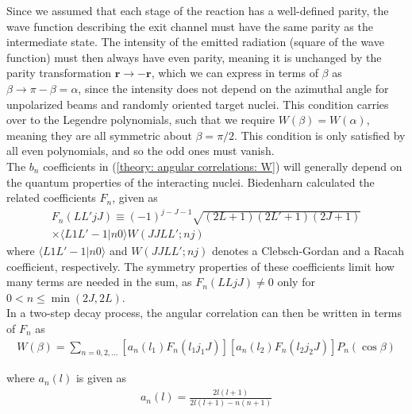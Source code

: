 Since we assumed that each stage of the reaction has a well-defined parity, the wave function describing the exit channel must have the same parity as the intermediate state. The intensity of the emitted radiation (square of the wave function) must then always have even parity, meaning it is unchanged by the parity transformation $\textbf{r} \rightarrow -\textbf{r}$, which we can express in terms of $\beta$ as $\beta \rightarrow \pi - \beta = \alpha$, since the intensity does not depend on the azimuthal angle for unpolarized beams and randomly oriented target nuclei. This condition carries over to the Legendre polynomials, such that we require $W(\beta) = W(\alpha)$, meaning they are all symmetric about $\beta = \pi/2$. This condition is only satisfied by all even polynomials, and so the odd ones must vanish. \\

The $b_n$ coefficients in (\ref{theory: angular correlations: W}) will generally depend on the quantum properties of the interacting nuclei. Biedenharn \cite{Biedenharn} calculated the related coefficients $F_n$, given as
\begin{align*}
	F_n(LL'jJ) \equiv (-1)^{j-J-1}\sqrt{(2L+1)(2L'+1)(2J+1)}\\
	\times \langle L1L'-1|n0\rangle W(JJLL';nj)
\end{align*}
where $\langle L1L'-1|n0 \rangle$ and $W(JJLL';nj)$ denotes a Clebsch-Gordan and a Racah coefficient, respectively. The symmetry properties of these coefficients limit how many terms are needed in the sum, as $F_n(LLjJ) \neq 0$ only for ${0 < n \leq \min(2J, 2L)}$. \\

In a two-step decay process, the angular correlation can then be written in terms of $F_n$ as
\begin{align*}
	W(\beta) =  \sum_{n = 0,2,...}[a_n(l_1)F_n(l_1j_1J)][a_n(l_2)F_n(l_2j_2J)]P_n(\cos\beta)
\end{align*}

where $a_n(l)$ is given as
\begin{align*}
	a_n(l) = \frac{2l(l+1)}{2l(l+1) - n(n+1)}
\end{align*}

